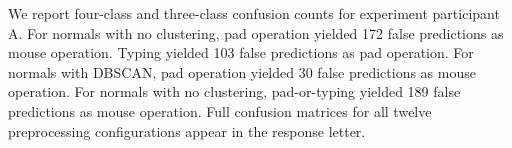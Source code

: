 

\begin{revisedblock}
We report four-class and three-class confusion counts for experiment participant A.
For normals with no clustering, pad operation yielded 172 false predictions as mouse operation.
  Typing yielded 103 false predictions as pad operation.
For normals with DBSCAN, pad operation yielded 30 false predictions as mouse operation.
For normals with no clustering, pad-or-typing yielded 189 false predictions as mouse operation.
Full confusion matrices for all twelve preprocessing configurations appear in the response letter.
\end{revisedblock}
